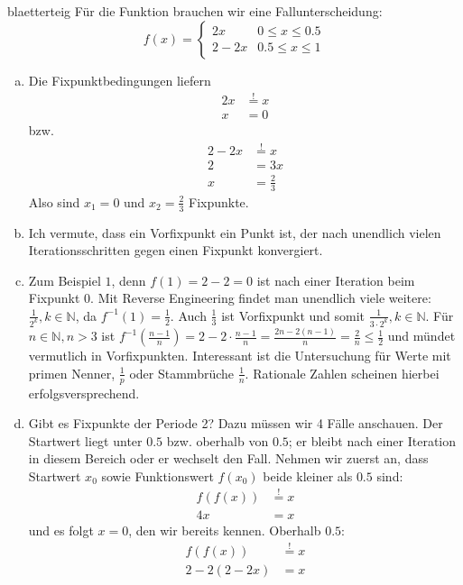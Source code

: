 \documentclass[%
<<<<<<< Updated upstream
11pt,%
twoside,%
titlepage,%
german,%
headsepline%
]{scrartcl}
\begin{document}
\begin{lsg}{blaetterteig}
F\"ur die Funktion brauchen wir eine Fallunterscheidung:
$$f(x)=\begin{cases}
2x & 0\leq x\leq0.5\\
2-2x & 0.5\leq x\leq1
\end{cases}$$

\begin{enumerate}[a)]
\item Die Fixpunktbedingungen liefern
\begin{align*}
2x &\stackrel{!}{=} x\\
x &= 0
\end{align*}
bzw.
\begin{align*}
2-2x &\stackrel{!}{=} x\\
2 &= 3x\\
x &=\frac{2}{3}
\end{align*}
Also sind $x_{1}=0$ und $x_{2}=\frac{2}{3}$ Fixpunkte.
\item Ich vermute, dass ein Vorfixpunkt ein Punkt ist, der nach unendlich vielen Iterationsschritten gegen einen Fixpunkt konvergiert.
\item Zum Beispiel $1$, denn $f(1)=2-2=0$ ist nach einer Iteration beim Fixpunkt $0$. Mit Reverse Engineering findet man unendlich viele weitere: $\frac{1}{2^{k}}, k\in\mathbb{N}$, da $f^{-1}(1)=\frac{1}{2}$. Auch $\frac{1}{3}$ ist Vorfixpunkt und somit $\frac{1}{3\cdot2^{k}}, k\in\mathbb{N}$. F\"ur $n\in\mathbb{N}, n>3$ ist $f^{-1}(\frac{n-1}{n})=2-2\cdot\frac{n-1}{n}=\frac{2n-2(n-1)}{n}=\frac{2}{n}\leq\frac{1}{2}$ und m\"undet vermutlich in Vorfixpunkten. Interessant ist die Untersuchung f\"ur Werte mit primen Nenner, $\frac{1}{p}$ oder Stammbr\"uche $\frac{1}{n}$. Rationale Zahlen scheinen hierbei erfolgsversprechend.
\item Gibt es Fixpunkte der Periode 2? Dazu m\"ussen wir 4 F\"alle anschauen. Der Startwert liegt unter $0.5$ bzw. oberhalb von $0.5$; er bleibt nach einer Iteration in diesem Bereich oder er wechselt den Fall. Nehmen wir zuerst an, dass Startwert $x_{0}$ sowie Funktionswert $f(x_{0})$ beide kleiner als $0.5$ sind:
\begin{align*}
f(f(x)) &\stackrel{!}{=} x\\
4x &= x
\end{align*}
und es folgt $x=0$, den wir bereits kennen. Oberhalb $0.5$:
\begin{align*}
f(f(x)) &\stackrel{!}{=} x\\
2-2(2-2x) &= x\\

\end{align*}
\end{enumerate}
\end{lsg}
\end{document}
